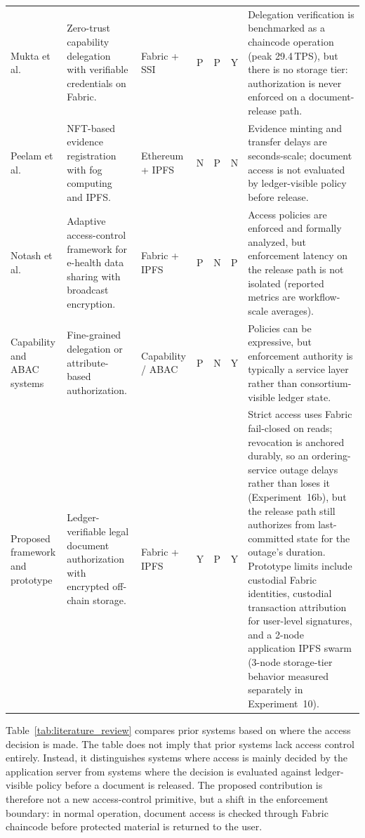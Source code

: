 \documentclass[preprint,12pt]{elsarticle}
\begin{document}
\begin{xltabular}{\textwidth}{@{}
>{\raggedright\arraybackslash}p{2.1cm}
>{\raggedright\arraybackslash}p{3.0cm}
>{\raggedright\arraybackslash}p{1.9cm}
c c c
>{\raggedright\arraybackslash}X
@{}}
Mukta et al.~\cite{mukta2026zerotrust} &
Zero-trust capability delegation with verifiable credentials on Fabric. &
Fabric + SSI &
P & P & Y &
Delegation verification is benchmarked as a chaincode operation (peak 29.4\,TPS), but there is no storage tier: authorization is never enforced on a document-release path. \\

Peelam et al.~\cite{peelam2026decentralized} &
NFT-based evidence registration with fog computing and IPFS. &
Ethereum + IPFS &
N & P & N &
Evidence minting and transfer delays are seconds-scale; document access is not evaluated by ledger-visible policy before release. \\

Notash et al.~\cite{notash2026adaptive} &
Adaptive access-control framework for e-health data sharing with broadcast encryption. &
Fabric + IPFS &
P & N & P &
Access policies are enforced and formally analyzed, but enforcement latency on the release path is not isolated (reported metrics are workflow-scale averages). \\

Capability and ABAC systems~\cite{macaroons2014,zanzibar2019,qian2021cpabe} &
Fine-grained delegation or attribute-based authorization. &
Capability / ABAC &
P & N & Y &
Policies can be expressive, but enforcement authority is typically a service layer rather than consortium-visible ledger state. \\

Proposed framework and prototype &
Ledger-verifiable legal document authorization with encrypted off-chain storage. &
Fabric + IPFS &
Y & P & Y &
Strict access uses Fabric fail-closed on reads; revocation is anchored durably, so an ordering-service outage delays rather than loses it (Experiment~16b), but the release path still authorizes from last-committed state for the outage's duration. Prototype limits include custodial Fabric identities, custodial transaction attribution for user-level signatures, and a 2-node application IPFS swarm (3-node storage-tier behavior measured separately in Experiment~10). \\

\end{xltabular}
\endgroup


Table~\ref{tab:literature_review} compares prior systems based on
where the access decision is made. The table does not imply that prior
systems lack access control entirely. Instead, it distinguishes systems
where access is mainly decided by the application server from systems
where the decision is evaluated against ledger-visible policy before a
document is released. The proposed contribution is therefore not a new
access-control primitive, but a shift in the enforcement boundary: in
normal operation, document access is checked through Fabric chaincode
before protected material is returned to the user.
\end{document}

